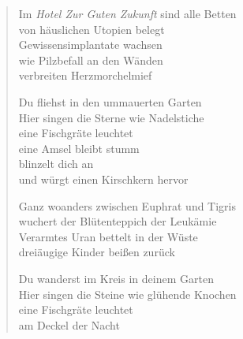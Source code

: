 

\begin{verse}
Im \emph{Hotel Zur Guten Zukunft} sind alle Betten\\
von häuslichen Utopien belegt\\
Gewissensimplantate wachsen\\
wie Pilzbefall an den Wänden\\
verbreiten Herzmorchelmief

Du fliehst in den ummauerten Garten\\
Hier singen die Sterne wie Nadelstiche\\
eine Fischgräte leuchtet\\
eine Amsel bleibt stumm\\
blinzelt dich an\\
und würgt einen Kirschkern hervor

Ganz woanders zwischen Euphrat und Tigris\\
wuchert der Blütenteppich der Leukämie\\
Verarmtes Uran bettelt in der Wüste\\
dreiäugige Kinder beißen zurück

Du wanderst im Kreis in deinem Garten\\
Hier singen die Steine wie glühende Knochen\\
eine Fischgräte leuchtet\\
am Deckel der Nacht
\end{verse}
